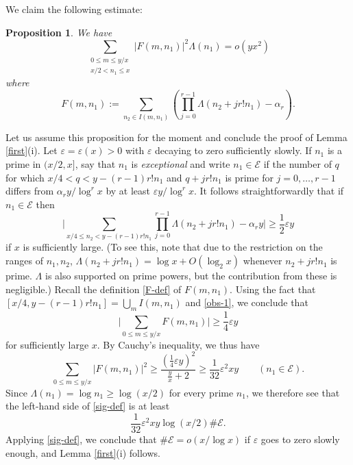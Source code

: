 \documentclass[11pt]{amsart}
\numberwithin{equation}{section}  %
\theoremstyle{remark}
\theoremstyle{plain}
\newtheorem{prop}{Proposition}
\numberwithin{equation}{section}
\newcommand{\eps}{\ensuremath{\varepsilon}}
\renewcommand{\le}{\leqslant}
\renewcommand{\leq}{\leqslant}
\renewcommand{\ge}{\geqslant}
\renewcommand{\geq}{\geqslant}
\renewcommand{\(}{\left(}
\renewcommand{\)}{\right)}
\begin{document}
We claim the following estimate:

\begin{prop}\label{sigma-prop}  We have
\begin{equation}\label{sig-def} 
\sum_{\substack{0 \leq m \leq y/x \\x/2 < n_1 \le x}} |F(m,n_1)|^2 \Lambda(n_1) = o(y x^2 )
\end{equation}
where
\begin{equation}\label{F-def} F(m,n_1) := \sum_{n_2 \in I(m,n_1)} \left(\prod_{j = 0}^{r-1} \Lambda(n_2 + jr! n_1) - \alpha_r\right).\end{equation}
\end{prop}

Let us assume this proposition for the moment and conclude the proof of Lemma \ref{first}(i).
Let $\eps=\eps(x)>0$ with $\eps$ decaying to zero sufficiently slowly.
If $n_1$ is a prime in $(x/2,x]$, say that $n_1$ is \emph{exceptional}
and write $n_1 \in \mathscr{E}$ if the number of $q$ for which $x/4 < q  < y - (r-1) r! n_1$ and $q + jr! n_1$ is prime for $j = 0,\dots, r-1$ differs from $\alpha_r y/\log^r x$ by at least $\eps y/\log^r x$. It follows straightforwardly
that if $n_1 \in \mathscr{E}$ then
\[ \Bigg| \sum_{x/4 \leq n_2 < y - (r-1) r! n_1} \prod_{j =
  0}^{r-1}\Lambda(n_2 + jr! n_1)  - \alpha_r y\Bigg| \geq
\frac{1}{2}\eps y\] if $x$ is sufficiently large. (To see
this, note that due to the restriction on the ranges of $n_1,n_2$,
$\Lambda(n_2 + j r! n_1) = \log x+O(\log_2 x)$ whenever $n_2 + jr!
n_1$ is prime. $\Lambda$ is also supported on prime powers, but the
contribution from these is negligible.)
Recall the definition \eqref{F-def} of $F(m,n_1)$.  Using
the fact that $[x/4, y - (r-1)r! n_1] = \bigcup_m I(m,n_1)$ and
\eqref{obs-1},
we conclude that
\[
\Bigg| \sum_{0\le m\le y/x} F(m,n_1) \Bigg| \ge \frac14 \eps y
\]
for sufficiently large $x$.  By Cauchy's inequality, we thus have
\[
 \sum_{0\le m\le y/x} |F(m,n_1)|^2 \ge \frac{\(\frac14 \eps
   y\)^2}{\frac{y}{x}+2}\ge \frac1{32} \eps^2 xy \qquad (n_1 \in  \mathscr{E}).
\]
Since $\Lambda(n_1) = \log n_1 \ge \log (x/2)$ for every prime $n_1$, we therefore see that the left-hand side of \eqref{sig-def} is at least
\[
\frac1{32} \eps^2 xy \log(x/2) \# \mathscr{E}.
\]
Applying \eqref{sig-def}, we conclude that $\# \mathscr{E}=o(x/\log x)$ if
$\eps$ goes to zero slowly enough, and Lemma \ref{first}(i) follows.
\end{document}
